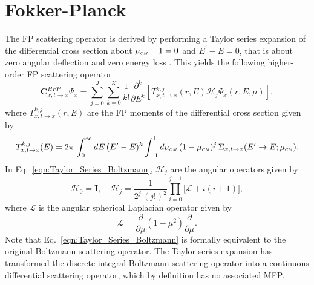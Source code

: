 \section{Fokker-Planck}
The FP scattering operator is derived by performing a Taylor series expansion of the differential cross section about $\mucm - 1= 0$ and $E^{\prime}-E = 0$, that is about zero angular deflection and zero energy loss \cite{Pomraning-1996}. This yields the following higher-order FP scattering operator
\begin{equation} \label{eqn:Taylor_Series_Boltzmann}
    \boldsymbol{C}_{x,t \rightarrow x}^{HFP} \Psi_x = \sum_{j=0}^{J} \sum_{k=0}^{K} \dfrac{1}{k!} \dfrac{\partial^k}{\partial E^k} \left[ T_{x,t\rightarrow x}^{k,j}(r,E) \boldsymbol{\mathcal{H}}_{j} \Psi_x(r,E,\mu) \right],
\end{equation}
where $T_{x,t\rightarrow x}^{k,j}(r,E)$ are the FP moments of the differential cross section given by
\begin{equation} \label{eqn:FP_data_moments}
    T_{x,t\rightarrow x}^{k,j} (E) = 2\pi \, \int_{0}^{\infty} dE \, (E^{\prime} - E)^k \int_{-1}^{1} d \mucm \, (1 - \mucm)^j \, \Sigma_{x,t\rightarrow x}(E^{\prime}\rightarrow E;\mucm).
\end{equation}
In Eq.~\eqref{eqn:Taylor_Series_Boltzmann}, $\boldsymbol{\mathcal{H}}_{j}$ are the angular operators given by
\begin{equation} \label{eqn:angular_operators}
    \boldsymbol{\mathcal{H}}_0 = \boldsymbol{I}, \quad \boldsymbol{\mathcal{H}}_j = \dfrac{1}{2^j \, (j!)^2} \prod_{i=0}^{j-1} \Big[ \boldsymbol{\mathcal{L}} + i(i+1) \Big],
\end{equation}
where $\boldsymbol{\mathcal{L}}$ is the angular spherical Laplacian operator given by
\begin{equation}
    \boldsymbol{\mathcal{L}} = \dfrac{\partial}{\partial \mu} (1 - \mu^2) \dfrac{\partial}{\partial \mu}.
\end{equation}
Note that Eq.~\eqref{eqn:Taylor_Series_Boltzmann} is formally equivalent to the original Boltzmann scattering operator. The Taylor series expansion has transformed the discrete integral Boltzmann scattering operator into a continuous differential scattering operator, which by definition has no associated MFP.

